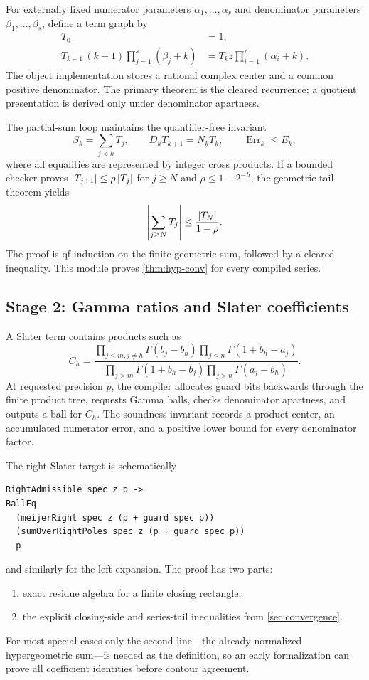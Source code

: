 For externally fixed numerator parameters $\alpha_1,\ldots,\alpha_r$ and
denominator parameters $\beta_1,\ldots,\beta_s$, define a term graph by
\begin{align*}
 T_0&=1,\\
 T_{k+1}\,(k+1)\prod_{j=1}^{s}(\beta_j+k)
 &=T_k z\prod_{i=1}^{r}(\alpha_i+k).
\end{align*}
The object implementation stores a rational complex center and a common
positive denominator.  The primary theorem is the cleared recurrence; a
quotient presentation is derived only under denominator apartness.

The partial-sum loop maintains the quantifier-free invariant
\begin{equation}\label{eq:lean-hyp-invariant}
 S_k=\sum_{j<k}T_j,
 \qquad
 D_kT_{k+1}=N_kT_k,
 \qquad
 \operatorname{Err}_k\le E_k,
\end{equation}
where all equalities are represented by integer cross products.  If a bounded
checker proves $\left|T_{j+1}\right|\le\rho\left|T_j\right|$ for $j\ge N$ and
$\rho\le1-2^{-h}$, the geometric tail theorem yields
\[
 \left|\sum_{j\ge N}T_j\right|\le \frac{\left|T_N\right|}{1-\rho}.
\]
The proof is qf induction on the finite geometric sum, followed by a cleared
inequality.  This module proves \cref{thm:hyp-conv} for every compiled series.

\subsection{Stage 2: Gamma ratios and Slater coefficients}

A Slater term contains products such as
\[
 C_h=
 \frac{\prod_{j\le m,j\ne h}\Gamma(b_j-b_h)
       \prod_{j\le n}\Gamma(1+b_h-a_j)}
      {\prod_{j>m}\Gamma(1+b_h-b_j)
       \prod_{j>n}\Gamma(a_j-b_h)}.
\]
At requested precision $p$, the compiler allocates guard bits backwards
through the finite product tree, requests Gamma balls, checks denominator
apartness, and outputs a ball for $C_h$.  The soundness invariant records a
product center, an accumulated numerator error, and a positive lower bound for
every denominator factor.

The right-Slater target is schematically
\begin{lstlisting}[language={}]
RightAdmissible spec z p ->
BallEq
  (meijerRight spec z (p + guard spec p))
  (sumOverRightPoles spec z (p + guard spec p))
  p
\end{lstlisting}
and similarly for the left expansion.  The proof has two parts:
\begin{enumerate}
\item exact residue algebra for a finite closing rectangle;
\item the explicit closing-side and series-tail inequalities from
      \cref{sec:convergence}.
\end{enumerate}
For most special cases only the second line---the already normalized
hypergeometric sum---is needed as the definition, so an early formalization can
prove all coefficient identities before contour agreement.

